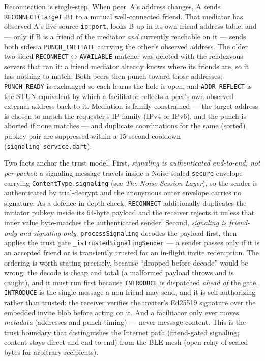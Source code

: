 \documentclass[11pt]{report}
\newcommand{\code}[1]{\texttt{\small #1}}
\begin{document}
Reconnection is single-step. When peer~A's address changes, A sends \code{RECONNECT(target=B)} to a mutual well-connected friend. That mediator has observed A's live source \code{ip:port}, looks B up in its own friend address table, and --- only if B is a friend of the mediator \emph{and} currently reachable on it --- sends both sides a \code{PUNCH\_INITIATE} carrying the other's observed address. The older two-sided \code{RECONNECT}$\leftrightarrow$\code{AVAILABLE} matcher was deleted with the rendezvous servers that ran it: a friend mediator already knows where its friends are, so it has nothing to match. Both peers then punch toward those addresses; \code{PUNCH\_READY} is exchanged so each learns the hole is open, and \code{ADDR\_REFLECT} is the STUN-equivalent by which a facilitator reflects a peer's own observed external address back to it. Mediation is family-constrained --- the target address is chosen to match the requester's IP family (IPv4 or IPv6), and the punch is aborted if none matches --- and duplicate coordinations for the same (sorted) pubkey pair are suppressed within a 15-second cooldown (\code{signaling_service.dart}).

Two facts anchor the trust model. First, \emph{signaling is authenticated end-to-end, not per-packet}: a signaling message travels inside a Noise-sealed \code{secure} envelope carrying \code{ContentType.signaling} (see \emph{The Noise Session Layer}), so the sender is authenticated by trial-decrypt and the anonymous outer envelope carries no signature. As a defence-in-depth check, \code{RECONNECT} additionally duplicates the initiator pubkey inside its 64-byte payload and the receiver rejects it unless that inner value byte-matches the authenticated sender. Second, \emph{signaling is friend-only and signaling-only}. \code{processSignaling} decodes the payload first, then applies the trust gate \code{\_isTrustedSignalingSender} --- a sender passes only if it is an accepted friend or is transiently trusted for an in-flight invite redemption. The ordering is worth stating precisely, because ``dropped before decode'' would be wrong: the decode is cheap and total (a malformed payload throws and is caught), and it must run first because \code{INTRODUCE} is dispatched \emph{ahead of} the gate. \code{INTRODUCE} is the single message a non-friend may send, and it is self-authorizing rather than trusted: the receiver verifies the inviter's Ed25519 signature over the embedded invite blob before acting on it. And a facilitator only ever moves \emph{metadata} (addresses and punch timing) --- never message content. This is the trust boundary that distinguishes the Internet path (friend-gated signaling; content stays direct and end-to-end) from the BLE mesh (open relay of sealed bytes for arbitrary recipients).
\end{document}
